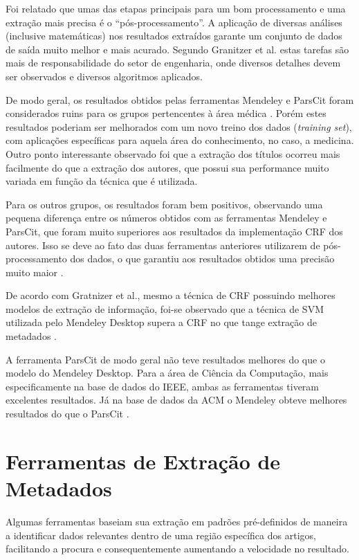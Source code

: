 Foi relatado que umas das etapas principais para um bom processamento e uma extração mais precisa é o ``pós-processamento''. A aplicação de diversas análises (inclusive matemáticas) nos resultados extraídos garante um conjunto de dados de saída muito melhor e mais acurado. Segundo Granitzer et al. \cite{Granitzer-2012-LayoutBased} estas tarefas são mais de responsabilidade do setor de engenharia, onde diversos detalhes devem ser observados e diversos algoritmos aplicados.

De modo geral, os resultados obtidos pelas ferramentas Mendeley e ParsCit foram considerados ruins para os grupos pertencentes à área médica \cite{Granitzer-2012-LayoutBased}. Porém estes resultados poderiam ser melhorados com um novo treino dos dados (\emph{training set}), com aplicações específicas para aquela área do conhecimento, no caso, a medicina. Outro ponto interessante observado foi que a extração dos títulos ocorreu mais facilmente do que a extração dos autores, que possui sua performance muito variada em função da técnica que é utilizada.

Para os outros grupos, os resultados foram bem positivos, observando uma pequena diferença entre os números obtidos com as ferramentas Mendeley e ParsCit, que foram muito superiores aos resultados da implementação CRF dos autores. Isso se deve ao fato das duas ferramentas anteriores utilizarem de pós-processamento dos dados, o que garantiu aos resultados obtidos uma precisão muito maior \cite{Granitzer-2012-LayoutBased}.

De acordo com Gratnizer et al., mesmo a técnica de CRF possuindo melhores modelos de extração de informação, foi-se observado que a técnica de SVM utilizada pelo Mendeley Desktop supera a CRF no que tange extração de metadados \cite{Granitzer-2012-LayoutBased}.

A ferramenta ParsCit de modo geral não teve resultados melhores do que o modelo do Mendeley Desktop. Para a área de Ciência da Computação, mais especificamente na base de dados do IEEE, ambas as ferramentas tiveram excelentes resultados. Já na base de dados da ACM o Mendeley obteve melhores resultados do que o ParsCit \cite{Granitzer-2012-LayoutBased}.

\section{Ferramentas de Extração de Metadados}
\label{sec:environments}

Algumas ferramentas baseiam sua extração em padrões pré-definidos de maneira a identificar dados relevantes dentro de uma região específica dos artigos, facilitando a procura e consequentemente aumentando a velocidade no resultado.

